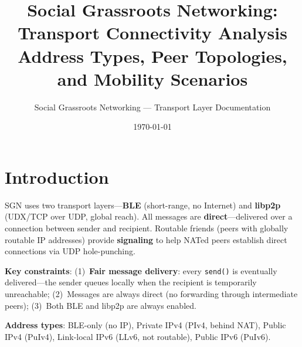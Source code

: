 \documentclass[11pt,a4paper]{article}
\title{\textbf{Social Grassroots Networking: Transport Connectivity Analysis}\\[0.5em]
\large Address Types, Peer Topologies, and Mobility Scenarios}
\author{Social Grassroots Networking --- Transport Layer Documentation}
\date{\today}
\begin{document}
\maketitle

\section{Introduction}

SGN uses two transport layers---\textbf{BLE} (short-range, no Internet) and \textbf{libp2p} (UDX/TCP over UDP, global reach). All messages are \textbf{direct}---delivered over a connection between sender and recipient. Routable friends (peers with globally routable IP addresses) provide \textbf{signaling} to help NATed peers establish direct connections via UDP hole-punching.

\textbf{Key constraints}: (1)~\textbf{Fair message delivery}: every \texttt{send()} is eventually delivered---the sender queues locally when the recipient is temporarily unreachable; (2)~Messages are always direct (no forwarding through intermediate peers); (3)~Both BLE and libp2p are always enabled.

\textbf{Address types}: BLE-only (no IP), Private IPv4 (PIv4, behind NAT), Public IPv4 (PuIv4), Link-local IPv6 (LLv6, not routable), Public IPv6 (PuIv6).
\end{document}
